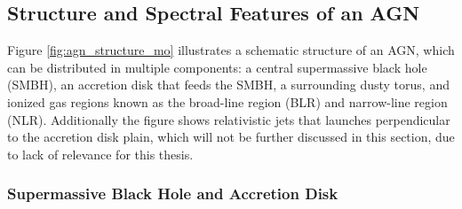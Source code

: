 \subsection{Structure and Spectral Features of an AGN}
\label{sec:agn_structure}

Figure \ref{fig:agn_structure_mo} illustrates a schematic structure of an AGN, which can be distributed in multiple components: a central supermassive black hole (SMBH), an accretion disk that feeds the SMBH, a surrounding dusty torus, and ionized gas regions known as the broad-line region (BLR) and narrow-line region (NLR). Additionally the figure shows relativistic jets that launches perpendicular to the accretion disk plain, which will not be further discussed in this section, due to lack of relevance for this thesis.


\subsubsection{Supermassive Black Hole and Accretion Disk}

